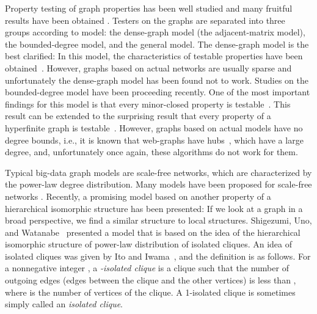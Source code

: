 \documentclass[11pt]{article}
\begin{document}
Property testing of graph properties has been well studied and many fruitful results have been obtained \cite{AlonFNS_Testable_Regularity_SIAMJC09,BSS_MC-testable_STOC08,PropertyTestingLNCS10,GR-STOC97,GGR-JACM98,HKNO_LocalPartition_FOCS09,NS_Testable_SJCOMP13,Levi-Ron_PO_ICALP13}.
Testers on the graphs are separated into three groups according to model: 
the dense-graph model (the adjacent-matrix model), 
the bounded-degree model, 
and 
the general model. 
The dense-graph model is the best clarified: 
In this model, the characteristics of testable properties have been obtained~\cite{AlonFNS_Testable_Regularity_SIAMJC09}.
However, graphs based on actual networks are usually sparse and unfortunately the dense-graph model has been found not to work. 
Studies on the bounded-degree model have been proceeding recently. 
One of the most important findings for this model is that every minor-closed property is testable~\cite{BSS_MC-testable_STOC08}.  
This result can be extended to the surprising result that every property of a hyperfinite graph is testable~\cite{NS_Testable_SJCOMP13}.
However, graphs based on actual models have no degree bounds, i.e., it is known that web-graphs have hubs~\cite{AlbertBarabasi_SF_02,KleinbergLawrence-web-science01}, which have a large degree, and, unfortunately once again, these algorithms do not work for them. 

Typical big-data graph models are scale-free networks, 
which are characterized by the power-law degree distribution.   
Many models have been proposed for scale-free networks \cite{AlbertBarabasi_SF_02,BM_Kronecker_IPL98,Broder_etal-GSinWeb-CN00,CU_SF_Clique_10,Gao_SF_clique_TCS09,KleinbergLawrence-web-science01,StochKronecherG_WAW07,Newman_SF_03,Uno-Watanabe_ScaleFree,WattsStrogatz-Nature98,ZRC_SF_clique_06}. 
Recently, a promising model based on another property of a hierarchical isomorphic structure 
has been presented: 
If we look at a graph in a broad perspective, 
we find a similar structure to local structures. 
Shigezumi, Uno, and Watanabe~\cite{Uno-Watanabe_ScaleFree}
presented a model that is based on the idea of the hierarchical isomorphic 
structure of power-law distribution of isolated cliques.  
An idea of isolated cliques was given by 
Ito and Iwama~\cite{IsoClique_TALG09,IsoClique_ESA05}, 
and the definition is as follows. 
For a nonnegative integer , a {\em -isolated clique}
is a clique such that the number of outgoing edges (edges between the clique and the other vertices) 
is less than , where  is the number of vertices of the clique. 
A 1-isolated clique is sometimes simply called an {\em isolated clique}. 
\end{document}
